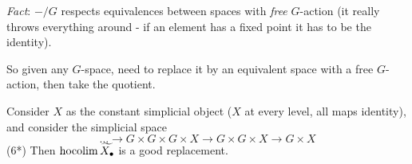 \documentclass[class=report, crop=false,a4paper,twoside]{standalone}
\begin{document}
\begin{example}
	\emph{Fact}: $-/G$ respects equivalences between spaces with \emph{free} $G$-action (it really throws everything around - if an element has a fixed point it has to be the identity). 

	So given any $G$-space, need to replace it by an equivalent space with a free $G$-action, then take the quotient.

	Consider $X$ as the constant simplicial object ($X$ at every level, all maps identity), and consider the simplicial space
	\[
	\dots \to G \times G \times G \times X \to G \times G \times X \to G \times X 
	\]
	(6*) Then $\operatorname{hocolim}\widetilde{X_\bullet}$ is a good replacement. 
\end{example}
\end{document}
